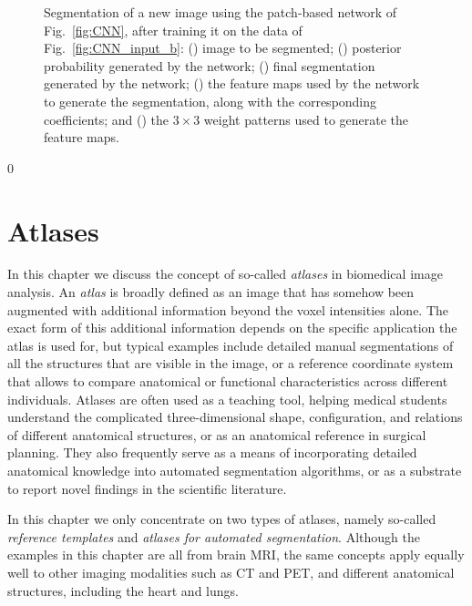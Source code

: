\documentclass[10pt,twoside]{book}
\def\hideChapterAtlases{0}
\begin{document}
\begin{figure}
\begin{subfigure}{0.31\textwidth}
    \caption{}
    \label{fig:CNN_output_e}
  \end{subfigure}
  \caption{Segmentation of a new image using the patch-based network of Fig.~\ref{fig:CNN}, after training it on the data of Fig.~\ref{fig:CNN_input_b}: 
  () image to be segmented;
  () posterior probability generated by the network; 
  () final segmentation generated by the network; 
  () the feature maps used by the network to generate the segmentation, along with the corresponding coefficients; 
  and
  () the $3 \times 3$ weight patterns used to generate the feature maps.
  }
  \label{fig:CNN_output}
\end{figure}


\fi

\if\hideChapterAtlases0

\chapter{Atlases}
\label{chap:atlases}

\noindent
In this chapter we discuss the concept of so-called \emph{atlases} in biomedical image analysis. An \emph{atlas}
is broadly defined as an image that has somehow been augmented with additional information beyond the voxel
intensities alone. The exact form of this additional information depends on the specific application the
atlas is used for, but typical examples include detailed manual segmentations of all the structures 
that are visible in the image, or 
a
reference coordinate system that allows to compare anatomical 
or functional characteristics across different individuals. Atlases are often used as a teaching tool, helping 
medical students understand the complicated three-dimensional shape, configuration, and relations of 
different anatomical structures, or as an anatomical reference in surgical planning. They also frequently 
serve as a means of incorporating detailed anatomical knowledge into automated segmentation algorithms, 
or as a substrate to report novel findings 
in the scientific literature.

In this chapter we only concentrate on two types of atlases, namely so-called \emph{reference templates} and \emph{atlases for
automated segmentation}. Although the examples in this chapter are all from brain MRI, the same concepts apply equally
well to other imaging modalities such as CT and PET, and different anatomical structures, including the heart and lungs.
\end{document}
